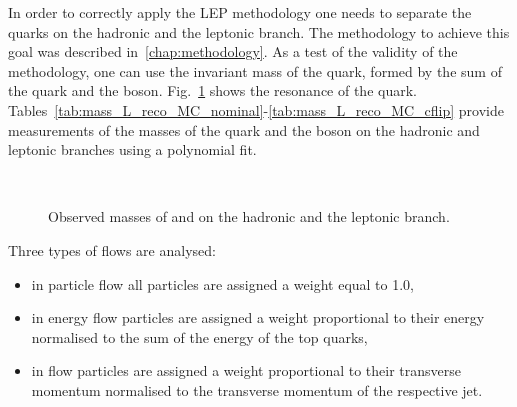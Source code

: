 \label{sec:LEP_methodology}
In order to correctly apply the LEP methodology one needs to separate the \cPqb quarks on the hadronic and the leptonic branch. The methodology to achieve this goal was described in~\ref{chap:methodology}. As a test of the validity of the methodology, one can use the invariant mass of the \cPqt quark, formed by the sum of the \cPqb quark and the \PW boson. Fig.~\ref{fig:L_jet_mass_reco} shows the resonance of the \cPqt quark. Tables~\ref{tab:mass_L_reco_MC_nominal}-\ref{tab:mass_L_reco_MC_cflip} provide measurements of the masses of the \cPqt quark and the \PW boson on the hadronic and leptonic branches using a polynomial fit.

  \begin{figure}[hbtp]
    \def\twidth{0.45}
    \hfil
  \\

 \hfil
 \caption{Observed masses of \PW and \cPqt on the hadronic and the leptonic branch.}
  \label{fig:L_jet_mass_reco}
\end{figure}








Three types of flows are analysed:
\begin{itemize}
\item in particle flow all particles are assigned a weight equal to 1.0,
\item in energy flow particles are assigned a weight proportional to their energy normalised to the sum of the energy of the top quarks,
\item in \pt flow particles are assigned a weight proportional to their transverse momentum normalised to the transverse momentum of the respective jet.
\end{itemize}

